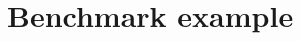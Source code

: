 \documentclass[lettersize,journal]{IEEEtran}
\begin{document}
\section{Benchmark  example}
\label{academic_example_section}






\end{document}
